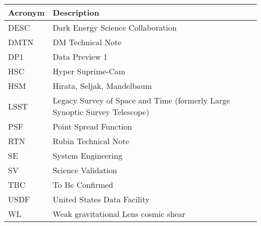 \addtocounter{table}{-1}
\begin{longtable}{p{}p{}}\hline
\textbf{Acronym} & \textbf{Description}  \\\hline

DESC & Dark Energy Science Collaboration \\\hline
DMTN & DM Technical Note \\\hline
DP1 & Data Preview 1 \\\hline
HSC & Hyper Suprime-Cam \\\hline
HSM & Hirata, Seljak, Mandelbaum \\\hline
LSST & Legacy Survey of Space and Time (formerly Large Synoptic Survey Telescope) \\\hline
PSF & Point Spread Function \\\hline
RTN & Rubin Technical Note \\\hline
SE & System Engineering \\\hline
SV & Science Validation \\\hline
TBC & To Be Confirmed \\\hline
USDF & United States Data Facility \\\hline
WL & Weak gravitational Lens cosmic shear \\\hline
\end{longtable}

